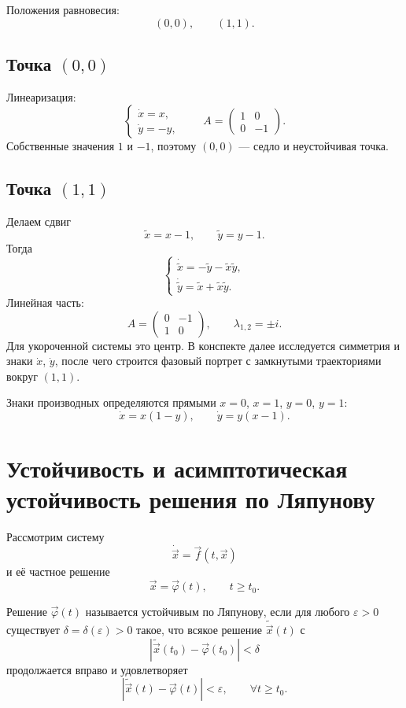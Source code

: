 \documentclass[12pt,a4paper]{article}
\numberwithin{equation}{section}
\newcommand{\vect}[1]{\vec{#1}}
\DeclareRobustCommand{\examtag}[1]{\space{\normalfont\small\color{HSEgray}(#1)}}
\begin{document}
Положения равновесия:
\[
(0,0),\qquad(1,1).
\]

\subsection{Точка \texorpdfstring{$(0,0)$}{(0,0)}}
Линеаризация:
\[
\begin{cases}
\dot x=x,\\
\dot y=-y,
\end{cases}
\qquad
A=\begin{pmatrix}1&0\\0&-1\end{pmatrix}.
\]
Собственные значения $1$ и $-1$, поэтому $(0,0)$ --- седло и неустойчивая точка.

\subsection{Точка \texorpdfstring{$(1,1)$}{(1,1)}}
Делаем сдвиг
\[
\widetilde x=x-1,
\qquad
\widetilde y=y-1.
\]
Тогда
\[
\begin{cases}
\dot{\widetilde x}=-\widetilde y-\widetilde x\widetilde y,\\
\dot{\widetilde y}=\widetilde x+\widetilde x\widetilde y.
\end{cases}
\]
Линейная часть:
\[
A=\begin{pmatrix}0&-1\\1&0\end{pmatrix},
\qquad \lambda_{1,2}=\pm i.
\]
Для укороченной системы это центр. В конспекте далее исследуется симметрия и знаки $\dot x$, $\dot y$, после чего строится фазовый портрет с замкнутыми траекториями вокруг $(1,1)$.

Знаки производных определяются прямыми $x=0$, $x=1$, $y=0$, $y=1$:
\[
\dot x=x(1-y),
\qquad
\dot y=y(x-1).
\]


\section[Устойчивость по Ляпунову\examtag{вопрос~27}]{Устойчивость и асимптотическая устойчивость решения по Ляпунову\examtag{вопрос~27}}

Рассмотрим систему
\[
\dot{\vect{x}}=\vect{f}(t,\vect{x})
\]
и её частное решение
\[
\vect{x}=\vect{\varphi}(t),
\qquad t\ge t_0.
\]

\begin{definitionHSE}
Решение $\vect{\varphi}(t)$ называется устойчивым по Ляпунову, если для любого $\varepsilon>0$ существует $\delta=\delta(\varepsilon)>0$ такое, что всякое решение $\widetilde{\vect{x}}(t)$ с
\[
|\widetilde{\vect{x}}(t_0)-\vect{\varphi}(t_0)|<\delta
\]
продолжается вправо и удовлетворяет
\[
|\widetilde{\vect{x}}(t)-\vect{\varphi}(t)|<\varepsilon,
\qquad \forall t\ge t_0.
\]
\end{definitionHSE}
\end{document}
